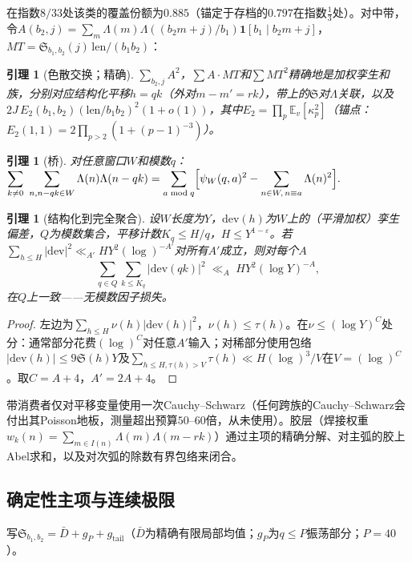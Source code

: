 \documentclass[11pt]{article}
\numberwithin{equation}{section}
\newtheorem{lemma}[theorem]{引理}
\theoremstyle{definition}
\theoremstyle{remark}
\newcommand{\LL}{\Lambda}
\newcommand{\SSS}{\mathfrak{S}}
\begin{document}
\noindent 在指数$8/33$处该类的覆盖份额为$0.885$（锚定于存档的$0.797$在指数$\tfrac13$处）。对中带，令$A(b_2,j)=\sum_m\LL(m)\LL((b_2m+j)/b_1)\mathbf1[b_1\mid b_2m+j]$，$MT=\SSS_{b_1,b_2}(j)\,\mathrm{len}/(b_1b_2)$：

\begin{lemma}[色散交换；精确]\label{l:swaps}
$\sum_{b_2,j}A^2$，$\sum A\cdot MT$和$\sum MT^2$精确地是加权孪生和族，分别对应结构化平移$h=qk$（外对$m-m'=rk$），带上的$\SSS$对$\LL$关联，以及$2J\,E_2(b_1,b_2)(\mathrm{len}/b_1b_2)^2(1+o(1))$，其中$E_2=\prod_p\mathbb E_v[\kappa_p^2]$（锚点：$E_2(1,1)=2\prod_{p>2}(1+(p-1)^{-3})$）。
\end{lemma}

\begin{lemma}[桥]\label{l:bridge}
对任意窗口$W$和模数$q$：
$\displaystyle\sum_{k\ne0}\ \sum_{n,n-qk\in W}\LL(n)\LL(n-qk)
=\sum_{a\bmod q}\Bigl[\psi_W(q,a)^2-\sum_{n\in W,\,n\equiv a}
\LL(n)^2\Bigr].$
\end{lemma}

\begin{lemma}[结构化到完全聚合]\label{l:U}
设$W$长度为$Y$，$\mathrm{dev}(h)$为$W$上的（平滑加权）孪生偏差，$Q$为模数集合，平移计数$K_q\le H/q$，$H\le Y^{1-\varepsilon}$。若$\sum_{h\le H}|\mathrm{dev}|^2\ll_{A'}HY^2(\log)^{-A'}$对所有$A'$成立，则对每个$A$
\[
\sum_{q\in Q}\sum_{k\le K_q}|\mathrm{dev}(qk)|^2
\;\ll_A\;HY^2(\log Y)^{-A},
\]
在$Q$上一致——无模数因子损失。
\end{lemma}

\begin{proof}
左边为$\sum_{h\le H}\nu(h)|\mathrm{dev}(h)|^2$，$\nu(h)\le\tau(h)$。在$\nu\le(\log Y)^{C}$处分：通常部分花费$(\log)^{C}$对任意$A'$输入；对稀部分使用包络$|\mathrm{dev}(h)|\le9\SSS(h)Y$及$\sum_{h\le H,\tau(h)>V}\tau(h)\ll H(\log)^3/V$在$V=(\log)^{C}$。取$C=A+4$，$A'=2A+4$。
\end{proof}

\noindent 带消费者仅对平移变量使用一次Cauchy--Schwarz（任何跨族的Cauchy--Schwarz会付出其Poisson地板，测量超出预算$50$--$60$倍，从未使用）。胶层（焊接权重$w_k(n)=\sum_{m\in I(n)}\LL(m)\LL(m-rk)$）通过主项的精确分解、对主弧的胶上Abel求和，以及对次弧的\cite[命题5.4，附录A]{MRT}除数有界包络来闭合。

\subsection{确定性主项与连续极限}\label{s:fm:mains}

写$\SSS_{b_1,b_2}=\bar D+g_P+g_{\mathrm{tail}}$（$\bar D$为精确有限局部均值；$g_P$为$q\le P$振荡部分；$P=40$）。
\end{document}
